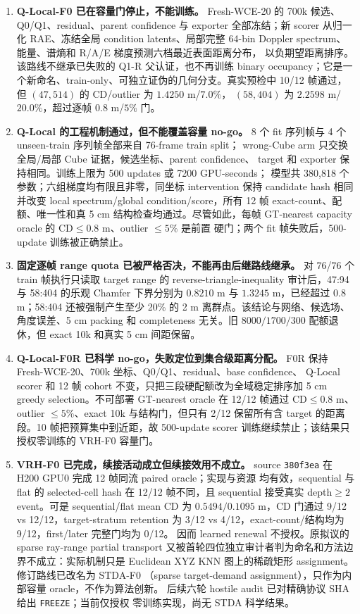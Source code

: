 \documentclass[11pt,a4paper,fontset=none]{ctexart}
\newcommand{\code}[1]{\texttt{#1}}
\begin{document}
\begin{enumerate}
  \item \textbf{Q-Local-F0 已在容量门停止，不能训练。}
  Fresh-WCE-20 的 700k 候选、Q0/Q1、residual、parent confidence 与 exporter
  全部冻结；新 scorer 从归一化 RAE、冻结全局 condition latents、局部完整
  64-bin Doppler spectrum、能量、谱熵和 R/A/E 梯度预测六档最近表面距离分布，
  以负期望距离排序。该路线不继承已失败的 Q1-R 父认证，也不再训练 binary
  occupancy；它是一个新命名、train-only、可独立证伪的几何分支。真实预检中
  10/12 帧通过，但 $(47,514)$ 的 CD/outlier 为 $1.4250$ m/$7.0\%$，
  $(58,404)$ 为 $2.2598$ m/$20.0\%$，超过逐帧 $0.8$ m/$5\%$ 门。

  \item \textbf{Q-Local 的工程机制通过，但不能覆盖容量 no-go。}
  8 个 fit 序列帧与 4 个 unseen-train 序列帧全部来自 76-frame train split；
  wrong-Cube arm 只交换全局/局部 Cube 证据，候选坐标、parent confidence、
  target 和 exporter 保持相同。训练上限为 500 updates 或 7200 GPU-seconds；
  模型共 380,818 个参数；六组梯度均有限且非零，同坐标 intervention 保持
  candidate hash 相同并改变 local spectrum/global condition/score，所有 12 帧
  exact-count、配额、唯一性和真 5 cm 结构检查均通过。尽管如此，每帧
  GT-nearest capacity oracle 的 $\mathrm{CD}\le0.8$ m、outlier $\le5\%$ 是前置
  硬门；两个 fit 帧失败后，500-update 训练被正确禁止。

  \item \textbf{固定逐帧 range quota 已被严格否决，不能再由后继路线继承。}
  对 76/76 个 train 帧执行只读取 target range 的 reverse-triangle-inequality
  审计后，47:94 与 58:404 的乐观 Chamfer 下界分别为 $0.8210$ m 与
  $1.3245$ m，已经超过 $0.8$ m；58:404 还被强制产生至少 20\% 的 2 m
  离群点。该结论与网络、候选场、角度误差、5 cm packing 和 completeness
  无关。旧 $8000/1700/300$ 配额退休，但 exact 10k 和真实 5 cm 间距保留。

  \item \textbf{Q-Local-F0R 已科学 no-go，失败定位到集合级距离分配。}
  F0R 保持 Fresh-WCE-20、700k 坐标、Q0/Q1、residual、base confidence、
  Q-Local scorer 和 12 帧 cohort 不变，只把三段硬配额改为全域稳定排序加
  5 cm greedy selection。不可部署 GT-nearest oracle 在 12/12 帧通过
  $\mathrm{CD}\le0.8$ m、outlier $\le5\%$、exact 10k 与结构门，但只有
  2/12 保留所有含 target 的距离段。10 帧把预算集中到近距，故 500-update
  scorer 训练继续禁止；该结果只授权零训练的 VRH-F0 容量门。

  \item \textbf{VRH-F0 已完成，续接活动成立但续接效用不成立。}
  source \code{380f3ea} 在 H200 GPU0 完成 12 帧同流 paired oracle；实现与资源
  均有效，sequential 与 flat 的 selected-cell hash 在 12/12 帧不同，且
  sequential 接受真实 depth$\ge2$ event。可是 sequential/flat mean CD 为
  $0.5494/0.1095$ m，CD 门通过 9/12 vs 12/12，target-stratum retention 为
  3/12 vs 4/12，exact-count/结构均为 9/12，first/later 完整门均为 0/12。
  因而 learned renewal 不授权。原拟议的 sparse ray-range partial transport
  又被首轮四位独立审计者判为命名和方法边界不成立：实际机制只是 Euclidean
  XYZ KNN 图上的稀疏矩形 assignment。修订路线已改名为 STDA-F0
  （sparse target-demand assignment），只作为内部容量 oracle，不作为算法创新。
  后续六轮 hostile audit 已对精确协议 SHA 给出 \code{FREEZE}；当前仅授权
  零训练实现，尚无 STDA 科学结果。


\end{enumerate}
\end{document}
